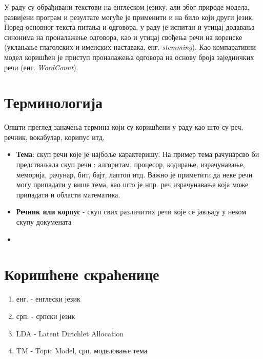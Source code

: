 У раду су обрађивани текстови на енглеском језику, али због природе модела, развијени програм и резултате могуће је применити и на било који други језик. Поред основног текста питања и одговора, у раду је испитан и утицај додавања синонима на проналажење одговора, као и утицај свођења речи на коренске (уклањање глаголских и именских наставака, енг. \textit{stemming}). Као компаративни модел коришћен је приступ проналажења одговора на основу броја заједничких речи (енг. \textit{WordCount}).%


\section{Терминологија}

Општи преглед заначења термина који су коришћени у раду као што су реч, речник, вокабулар, корипус итд.

\begin{itemize} 
\item \textbf{Тема}: скуп речи које је најбоље карактеришу. На пример тема рачунарсво би предстваљала скуп речи : алгоритам, процесор, кодирање, израчунавање, меморија, рачунар, бит, бајт, лаптоп итд. Важно је приметити да неке речи могу припадати у више тема, као што је нпр. реч израчунавање која може припадати и области математика.
\item \textbf{Речник или корпус} - скуп свих различитих речи које се јављају у неком скупу докумената
\item %
 \end{itemize}

\section{Коришћене скраћенице}
\begin{enumerate}
\item енг. - енглески језик
\item срп. - српски језик
\item LDA - Latent Dirichlet Allocation
\item TM - Topic Model, срп. моделовање тема
\end{enumerate}
